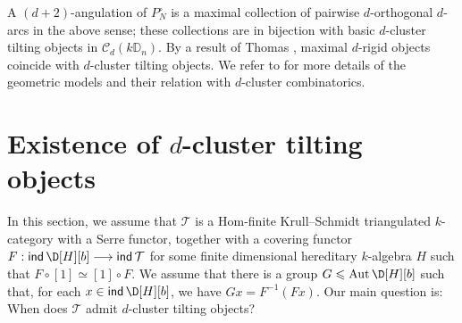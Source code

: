 \documentclass[12pt]{article}
\theoremstyle{plain}
\theoremstyle{definition}
\DeclareMathOperator{\Aut}{Aut}
\DeclareMathOperator{\ind}{\sf ind}
\newcommand{\Db}[1][]{\D[#1][b]}
\newcommand{\T}{\mathcal{T}}
\newcommand{\lra}{\longrightarrow}
\renewcommand{\leq}{\leqslant}
\begin{document}
 

A \((d+2)\)-angulation of \(P_N^{\circ}\) is a maximal collection of
pairwise \(d\)-orthogonal \(d\)-arcs in the above sense; these collections are
in bijection with basic \(d\)-cluster tilting objects in
\(\mathcal C_d(k\mathbb D_n)\). By a result of Thomas
\cite[Theorem 1]{Thomas2007}, maximal \(d\)-rigid objects coincide with
\(d\)-cluster tilting objects. We refer to
\cite{Schiffler2008,Baur2007,Baur2008,Zhou2009,Thomas2007} for more details of
the geometric models and their relation with \(d\)-cluster combinatorics.



\section{Existence of $d$-cluster tilting objects}


In this section, we assume that $\T$ is a Hom-finite Krull--Schmidt triangulated $k$-category with a Serre functor, together with a covering functor \(F:\ind\Db[H]\lra \ind\T\)
for some finite dimensional hereditary $k$-algebra $H$ such that $F\circ[1]\simeq [1]\circ F$. We assume that there is a group $G\leq\Aut\Db[H]$ such that, for each $x\in\ind\Db[H]$, we have
\(Gx=F^{-1}(Fx)\).
  Our main question is: When does $\T$ admit $d$-cluster tilting objects?
\end{document}
